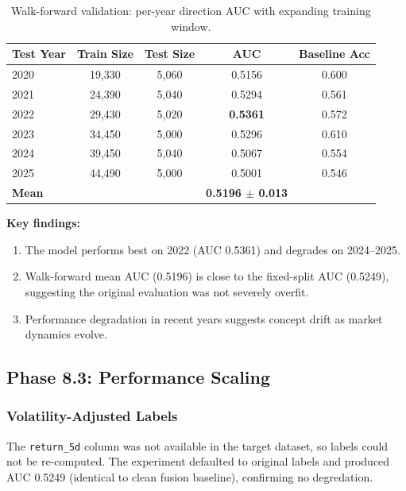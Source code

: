 \documentclass[12pt,a4paper]{article}
\begin{document}
\begin{table}[H]
\centering
\caption{Walk-forward validation: per-year direction AUC with expanding training window.}
\begin{tabular}{lcccc}
\toprule
\textbf{Test Year} & \textbf{Train Size} & \textbf{Test Size} & \textbf{AUC} & \textbf{Baseline Acc} \\
\midrule
2020 & 19,330 & 5,060 & 0.5156 & 0.600 \\
2021 & 24,390 & 5,040 & 0.5294 & 0.561 \\
2022 & 29,430 & 5,020 & \textbf{0.5361} & 0.572 \\
2023 & 34,450 & 5,000 & 0.5296 & 0.610 \\
2024 & 39,450 & 5,040 & 0.5067 & 0.554 \\
2025 & 44,490 & 5,000 & 0.5001 & 0.546 \\
\midrule
\textbf{Mean} & & & \textbf{0.5196 $\pm$ 0.013} & \\
\bottomrule
\end{tabular}
\end{table}

\textbf{Key findings:}
\begin{enumerate}[noitemsep]
    \item The model performs best on 2022 (AUC 0.5361) and degrades on 2024--2025.
    \item Walk-forward mean AUC (0.5196) is close to the fixed-split AUC (0.5249), suggesting the original evaluation was not severely overfit.
    \item Performance degradation in recent years suggests concept drift as market dynamics evolve.
\end{enumerate}

\subsection{Phase 8.3: Performance Scaling}
\label{sec:v2phase3}

\subsubsection{Volatility-Adjusted Labels}

The \texttt{return\_5d} column was not available in the target dataset, so labels could not be re-computed. The experiment defaulted to original labels and produced AUC 0.5249 (identical to clean fusion baseline), confirming no degredation.
\end{document}
